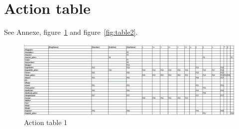 \documentclass[12pt]{article}
\begin{document}
\section{Action table}
See Annexe, figure~\ref{fig:table1} and figure~\ref{fig:table2}.
\begin{figure}[!h]
    \centering
    \includegraphics[height = 20 cm]{actionTable1.JPG}
    \caption{Action table 1}
    \label{fig:table1}
\end{figure}
\end{document}
